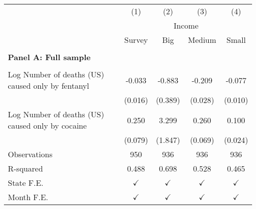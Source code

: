 \begin{tabular}{lcccc} \\ \hline 
                    &\multicolumn{1}{c}{(1)}         &\multicolumn{1}{c}{(2)}         &\multicolumn{1}{c}{(3)}         &\multicolumn{1}{c}{(4)}         \\
 & \multicolumn{4}{c}{Income} \\ \cline{2-5} & Survey  &  \multicolumn{1}{c}{Big} & \multicolumn{1}{c}{Medium}& \multicolumn{1}{c}{Small} \\ \hline   &  &  &  &  \\ \textbf{Panel A: Full sample} \\ & & & & \\
Log Number of deaths (US) caused only by fentanyl&      -0.033\sym{*}  &      -0.883\sym{*}  &      -0.209\sym{***}&      -0.077\sym{***}\\
                    &     (0.016)         &     (0.389)         &     (0.028)         &     (0.010)         \\
\addlinespace
Log Number of deaths (US) caused only by cocaine&       0.250\sym{**} &       3.299         &       0.260\sym{***}&       0.100\sym{***}\\
                    &     (0.079)         &     (1.847)         &     (0.069)         &     (0.024)         \\
\arrayrulecolor{black!10}\midrule
Observations        &         950         &         936         &         936         &         936         \\
R-squared           &       0.488         &       0.698         &       0.528         &       0.465         \\
State F.E.          &$\checkmark$         &$\checkmark$         &$\checkmark$         &$\checkmark$         \\
Month F.E.          &$\checkmark$         &$\checkmark$         &$\checkmark$         &$\checkmark$         \\



\end{tabular}
